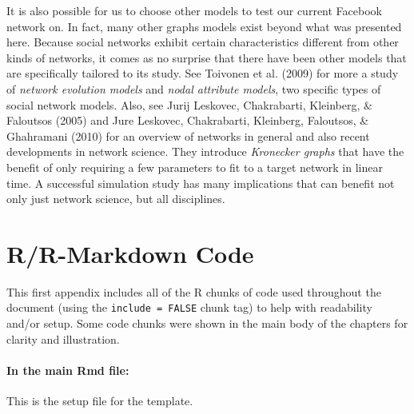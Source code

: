\documentclass[12pt,twoside]{amherstthesis}
\begin{document}
  It is also possible for us to choose other models to test our current
  Facebook network on. In fact, many other graphs models exist beyond what
  was presented here. Because social networks exhibit certain
  characteristics different from other kinds of networks, it comes as no
  surprise that there have been other models that are specifically
  tailored to its study. See Toivonen et al. (2009) for more a study of
  \emph{network evolution models} and \emph{nodal attribute models}, two
  specific types of social network models. Also, see Jurij Leskovec,
  Chakrabarti, Kleinberg, \& Faloutsos (2005) and Jure Leskovec,
  Chakrabarti, Kleinberg, Faloutsos, \& Ghahramani (2010) for an overview
  of networks in general and also recent developments in network science.
  They introduce \emph{Kronecker graphs} that have the benefit of only
  requiring a few parameters to fit to a target network in linear time. A
  successful simulation study has many implications that can benefit not
  only just network science, but all disciplines.
  
  \singlespacing
  
  \appendix
  
  \chapter{R/R-Markdown Code}\label{rr-markdown-code}
  
  This first appendix includes all of the R chunks of code used throughout
  the document (using the \texttt{include\ =\ FALSE} chunk tag) to help
  with readability and/or setup. Some code chunks were shown in the main
  body of the chapters for clarity and illustration.
  
  \subsubsection{In the main Rmd file:}\label{in-the-main-rmd-file}
  
  This is the setup file for the template.
  
  \begin{Shaded}
  \begin{Highlighting}[]
    \NormalTok{(}\NormalTok{, } \NormalTok{)}
    \NormalTok{(}\NormalTok{)}
  \NormalTok{\}}
  \end{Highlighting}
  \end{Shaded}
  
\end{document}
